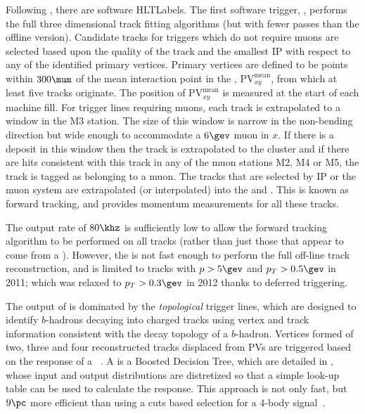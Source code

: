 Following \lone, there are software \glspl{HLTLabel}.
The first software trigger, \hltone, performs the full three dimensional \velo track fitting
algorithms (but with fewer passes than the offline version).
Candidate \velo tracks for triggers which do not require muons are selected based upon the quality of the
\velo track and the smallest IP with respect to any of the identified primary vertices.
Primary vertices are defined to be points within $300\mum$ of the mean
interaction point in the , $\mathrm{PV}^\mathrm{mean}_{xy}$, from which at least five
tracks originate.
The position of $\mathrm{PV}^\mathrm{mean}_{xy}$ is measured at the start of each \lhc machine
fill.
For trigger lines requiring muons, each \velo track is extrapolated to a window in the M3
station.
The size of this window is narrow in the non-bending direction but wide enough to accommodate a $6\gev$
muon in $x$.
If there is a deposit in this window then the \velo track is extrapolated to the cluster and if
there are hits consistent with this track in any of the muon stations M2, M4 or M5, the track is
tagged as belonging to a muon.
The \velo tracks that are selected by IP or the muon system are extrapolated (or interpolated) into
the \intr and \ot.
This is known as forward tracking, and provides momentum measurements for all these tracks.


The \hltone output rate of $80\khz$ is sufficiently low to allow the forward tracking algorithm to
be performed on all \velo tracks (rather than just those that appear to come from a \pv).
However, the \hlttwo is not fast enough to perform the full off-line track reconstruction, and
is limited to \velo tracks with
$p>5\gev$ and $p_T>0.5\gev$ in 2011; which was relaxed to $p_T>0.3\gev$ in 2012 thanks to deferred
triggering.

The output of \hlttwo is dominated by the \emph{topological} trigger lines, which are designed to
identify $b$-hadrons decaying into charged tracks using vertex and track information consistent
with the decay topology of a $b$-hadron.
Vertices formed of two, three and four reconstructed tracks displaced from \glspl{PV} are triggered
based on the response of a \BBDT~\cite{Gligorov:2012qt}.
A \BBDT is a Boosted Decision Tree, which are detailed in , whose input and output
distributions are distretized so that a simple look-up table can be used to calculate the response.
This approach is not only fast, but $9\pc$ more efficient than using a cuts based selection for a
4-body signal~\cite{Gligorov:2012qt}.


